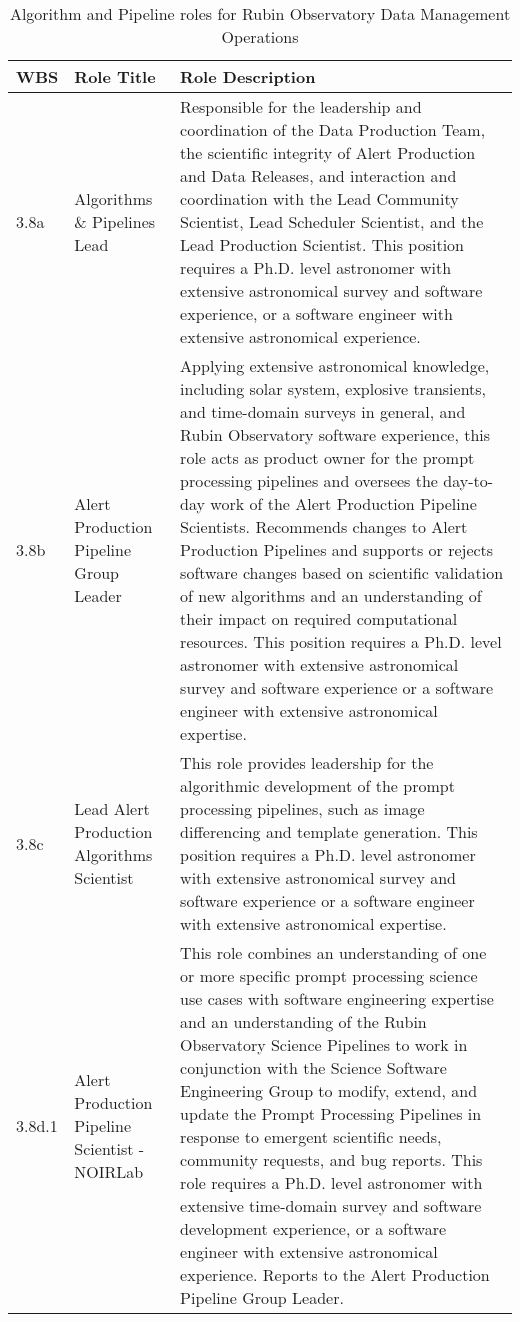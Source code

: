 \normalsize \begin{longtable} {|p{}|p{}|p{}|} \caption{Algorithm and Pipeline roles for Rubin Observatory Data Management Operations \label{tab:apfroles}}\\ 
\hline 
\textbf{WBS}&\textbf{Role Title}&\textbf{Role Description} \\ \hline
{3.8a}&{Algorithms \& Pipelines Lead}&{Responsible for the leadership and coordination of the Data Production Team, the scientific integrity of Alert Production and Data Releases, and interaction and coordination with the Lead Community Scientist, Lead Scheduler Scientist, and the Lead Production Scientist. This position requires a Ph.D. level astronomer with extensive astronomical survey and software experience, or a software engineer with extensive astronomical experience.} \\ \hline
{3.8b}&{Alert Production Pipeline Group Leader}&{Applying extensive astronomical knowledge, including solar system, explosive transients, and time-domain surveys in general, and Rubin Observatory software experience, this role acts as product owner for the prompt processing pipelines and oversees the day-to-day work of the Alert Production Pipeline Scientists. Recommends changes to Alert Production Pipelines and supports or rejects software changes based on scientific validation of new algorithms and an understanding of their impact on required computational resources. This position requires a Ph.D. level astronomer with extensive astronomical survey and software experience or a software engineer with extensive astronomical expertise.} \\ \hline
{3.8c}&{Lead Alert Production Algorithms Scientist}&{This role provides leadership for the algorithmic development of the prompt processing pipelines, such as image differencing and template generation. This position requires a Ph.D. level astronomer with extensive astronomical survey and software experience or a software engineer with extensive astronomical expertise.} \\ \hline
{3.8d.1}&{Alert Production Pipeline Scientist - NOIRLab}&{This role combines an understanding of one or more specific prompt processing science use cases with software engineering expertise and an understanding of the Rubin Observatory Science Pipelines to work in conjunction with the Science Software Engineering Group to modify, extend, and update the Prompt Processing Pipelines in response to emergent scientific needs, community requests, and bug reports. This role requires a Ph.D. level astronomer with extensive time-domain survey and software development experience, or a software engineer with extensive astronomical experience. Reports to the Alert Production Pipeline Group Leader.} \\ \hline

\end{longtable}
